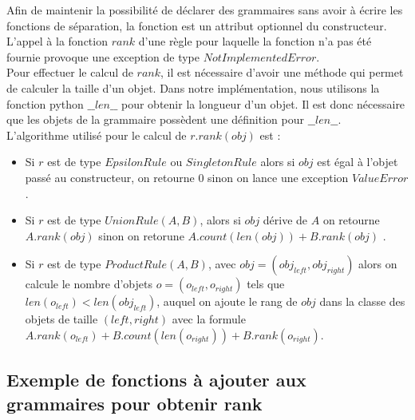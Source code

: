 \documentclass[a4paper, titlepage]{article}
\begin{document}
Afin de maintenir la possibilité de déclarer des grammaires sans avoir
à écrire les fonctions de séparation, la fonction est un attribut
optionnel du constructeur. L'appel à la fonction $rank$ d'une règle
pour laquelle la fonction n'a pas été fournie provoque une exception
de type $NotImplementedError$. \\

Pour effectuer le calcul de $rank$, il est nécessaire d'avoir une
méthode qui permet de calculer la taille d'un objet. Dans notre
implémentation, nous utilisons la fonction python $\_\_len\_\_$ pour
obtenir la longueur d'un objet. Il est donc nécessaire que les objets
de la grammaire possèdent une définition pour $\_\_len\_\_$.\\

L'algorithme utilisé pour le calcul de $r.rank(obj)$ est :\\

\begin{itemize}
  
\item Si $r$ est de type $EpsilonRule$ ou $SingletonRule$ alors si
  $obj$ est égal à l'objet passé au constructeur, on retourne 0 sinon on
  lance une exception $ValueError$.\\

\item Si $r$ est de type $UnionRule(A, B)$, alors si $obj$ dérive de
  $A$ on retourne $A.rank(obj)$ sinon on retorune $A.count(len(obj)) +
  B.rank(obj)$ .\\

\item Si $r$ est de type $ProductRule(A, B)$, avec $obj = (obj_{left},
  obj_{right})$ alors on calcule le nombre d'objets $o =
  (o_{left}, o_{right})$ tels que $len(o_{left}) < len(obj_{left})$,
  auquel on ajoute le rang de $obj$ dans la classe des objets de
  taille $(left, right)$ avec la formule $A.rank(o_{left}) +
  B.count(len(o_{right})) + B.rank(o_{right})$.\\
  
\end{itemize}

\subsection{Exemple de fonctions à ajouter aux grammaires pour obtenir
  rank}
\end{document}
